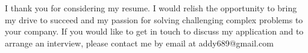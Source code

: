 I thank you for considering my resume. I would relish the opportunity to bring my drive to succeed and my passion for solving challenging complex problems to your company. If you would like to get in touch to discuss my application and to arrange an interview, please contact me by email at addy689@gmail.com 

\makeletterclosing

